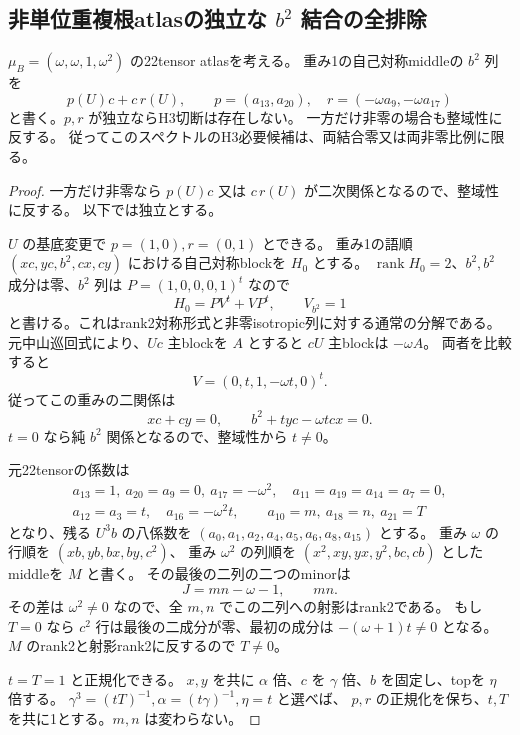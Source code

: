 \subsection{非単位重複根atlasの独立な $b^2$ 結合の全排除}
\label{subsec:cubic-third-root-nonunit-independent}
\begin{theorem}[非単位重複根の最初の全領域排除]
\label{thm:cubic-third-root-nonunit-independent-empty}
$\mu_B=(\omega,\omega,1,\omega^2)$ の22tensor atlasを考える。
重み1の自己対称middleの $b^2$ 列を
\[
 p(U)c+c\,r(U),\qquad
 p=(a_{13},a_{20}),\quad r=(-\omega a_9,-\omega a_{17})
\]
と書く。$p,r$ が独立ならH3切断は存在しない。
一方だけ非零の場合も整域性に反する。
従ってこのスペクトルのH3必要候補は、両結合零又は両非零比例に限る。
\end{theorem}
\begin{proof}
一方だけ非零なら $p(U)c$ 又は $c\,r(U)$ が二次関係となるので、整域性に反する。
以下では独立とする。

$U$ の基底変更で $p=(1,0),r=(0,1)$ とできる。
重み1の語順 $(xc,yc,b^2,cx,cy)$ における自己対称blockを $H_0$ とする。
$\operatorname{rank}H_0=2$、$b^2,b^2$ 成分は零、$b^2$ 列は
$P=(1,0,0,0,1)^t$ なので
\[
 H_0=PV^t+VP^t,\qquad V_{b^2}=1
\]
と書ける。これはrank2対称形式と非零isotropic列に対する通常の分解である。
元中山巡回式により、$Uc$ 主blockを $A$ とすると $cU$ 主blockは $-\omega A$。
両者を比較すると
\[
 V=(0,t,1,-\omega t,0)^t.
\]
従ってこの重みの二関係は
\[
 xc+cy=0,\qquad b^2+t yc-\omega t cx=0.
\]
$t=0$ なら純 $b^2$ 関係となるので、整域性から $t\ne0$。

元22tensorの係数は
\begin{gather*}
 a_{13}=1,\ a_{20}=a_9=0,\ a_{17}=-\omega^2,\quad
 a_{11}=a_{19}=a_{14}=a_7=0,\\
 a_{12}=a_3=t,\quad a_{16}=-\omega^2t,
 \qquad a_{10}=m,\ a_{18}=n,\ a_{21}=T
\end{gather*}
となり、残る $U^3b$ の八係数を
$(a_0,a_1,a_2,a_4,a_5,a_6,a_8,a_{15})$ とする。
重み $\omega$ の行順を $(xb,yb,bx,by,c^2)$、
重み $\omega^2$ の列順を $(x^2,xy,yx,y^2,bc,cb)$ としたmiddleを $M$ と書く。
その最後の二列の二つのminorは
\[
 J=mn-\omega-1,
 \qquad mn.
\]
その差は $\omega^2\ne0$ なので、全 $m,n$ でこの二列への射影はrank2である。
もし $T=0$ なら $c^2$ 行は最後の二成分が零、最初の成分は
$-(\omega+1)t\ne0$ となる。
$M$ のrank2と射影rank2に反するので $T\ne0$。

$t=T=1$ と正規化できる。
$x,y$ を共に $\alpha$ 倍、$c$ を $\gamma$ 倍、$b$ を固定し、topを $\eta$ 倍する。
$\gamma^3=(tT)^{-1},\alpha=(t\gamma)^{-1},\eta=t$ と選べば、
$p,r$ の正規化を保ち、$t,T$ を共に1とする。$m,n$ は変わらない。


\end{proof}
